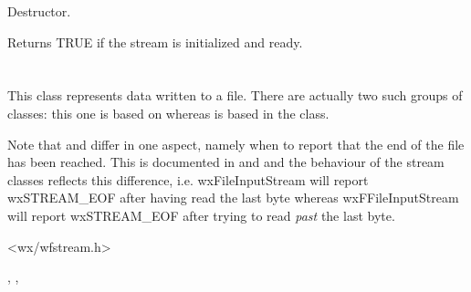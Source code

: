 

Destructor.



Returns TRUE if the stream is initialized and ready.

\section{}\label{wxfileoutputstream}

This class represents data written to a file. There are actually
two such groups of classes: this one is based on  
whereas  is based in
the  class.

Note that  and  differ
in one aspect, namely when to report that the end of the file has been
reached. This is documented in  and 
 and the behaviour of the stream
classes reflects this difference, i.e. wxFileInputStream will report
wxSTREAM\_EOF after having read the last byte whereas wxFFileInputStream
will report wxSTREAM\_EOF after trying to read {\it past} the last byte.




<wx/wfstream.h>


, , 




